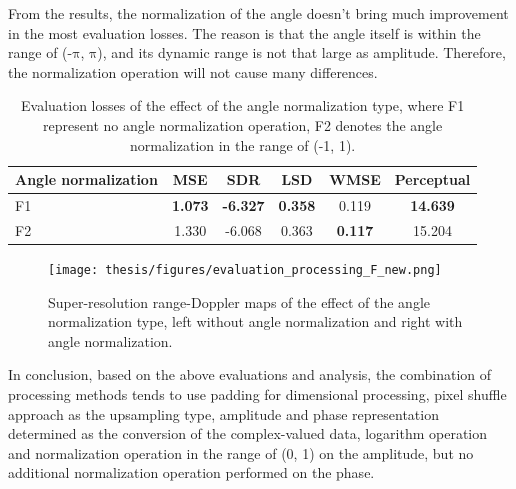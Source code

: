 From the results, the normalization of the angle doesn't bring much improvement in the most evaluation losses. The reason is that the angle itself is within the range of (-$\mathrm{\pi}$, $\mathrm{\pi}$), and its dynamic range is not that large as amplitude. Therefore, the normalization operation will not cause many differences.

\begin{table}
    \centering
    \caption{Evaluation losses of the effect of the angle normalization type, where F1 represent no angle normalization operation, F2 denotes the angle normalization in the range of (-1, 1).}
    \label{Evaluation losses of the angle normalization types comparison}
    \begin{tabular}{l|c|c|c|c|c}
        \hline
        Angle normalization & MSE & SDR & LSD & WMSE & Perceptual \\
        \hline
        F1 & \textbf{1.073} & \textbf{-6.327} & \textbf{0.358} & 0.119 & \textbf{14.639} \\
        \hline
        F2 & 1.330 & -6.068 & 0.363 & \textbf{0.117} & 15.204 \\
        \hline
    \end{tabular}
\end{table}

\begin{figure}
    \centering
    \texttt{[image: thesis/figures/evaluation\_processing\_F\_new.png]}
    \caption{Super-resolution range-Doppler maps of the effect of the angle normalization type, left without angle normalization and right with angle normalization.}
    \label{evaluation processing F}
\end{figure}

In conclusion, based on the above evaluations and analysis, the combination of processing methods tends to use padding for dimensional processing, pixel shuffle approach as the upsampling type, amplitude and phase representation determined as the conversion of the complex-valued data, logarithm operation and normalization operation in the range of (0, 1) on the amplitude, but no additional normalization operation performed on the phase.

